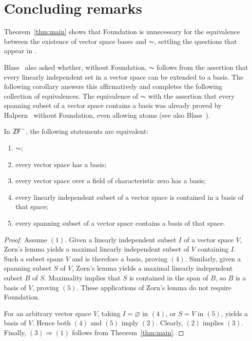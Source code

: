 \section{Concluding remarks}\label{sec:conclusion}

Theorem~\ref{thm:main} shows that Foundation is unnecessary for the
equivalence between the existence of vector space bases and $\AC$,
settling the questions that appear in
\cites[p.~33]{Blass}{Karagila2017MO}[p.~423]{Morillon}[p.~121]{Philip2025}.

Blass~\cite[p.~33]{Blass} also asked whether, without Foundation, $\AC$
follows from the assertion that every linearly independent set in a
vector space can be extended to a basis. The following corollary
answers this affirmatively and completes the following collection of
equivalences. The equivalence of $\AC$ with the assertion that every
spanning subset of a vector space contains a basis was already proved
by Halpern~\cite{Halpern1966} without Foundation, even allowing atoms
(see also Blass~\cite[p.~31]{Blass}).

\begin{corollary}\label{cor:basis-principles}
In $\mathsf{ZF}^{-}$, the following statements are equivalent:
\begin{enumerate}
\item $\AC$;
\item every vector space has a basis;
\item every vector space over a field of characteristic zero has a basis;
\item every linearly independent subset of a vector space is contained
in a basis of that space;
\item every spanning subset of a vector space contains a basis of
that space.
\end{enumerate}
\end{corollary}

\begin{proof}
Assume $(1)$. Given a linearly independent subset $I$ of a vector
space $V$, Zorn's lemma yields a maximal linearly independent subset
of $V$ containing $I$. Such a subset spans $V$ and is therefore a
basis, proving $(4)$. Similarly, given a spanning subset $S$ of $V$,
Zorn's lemma yields a maximal linearly independent subset $B$ of $S$.
Maximality implies that $S$ is contained in the span of $B$, so $B$
is a basis of $V$, proving $(5)$. These applications of Zorn's lemma
do not require Foundation.

For an arbitrary vector space $V$, taking $I=\varnothing$ in $(4)$,
or $S=V$ in $(5)$, yields a basis of $V$. Hence both $(4)$ and $(5)$
imply $(2)$. Clearly, $(2)$ implies $(3)$. Finally, $(3)\Rightarrow(1)$ follows from Theorem~\ref{thm:main}.
\end{proof}

